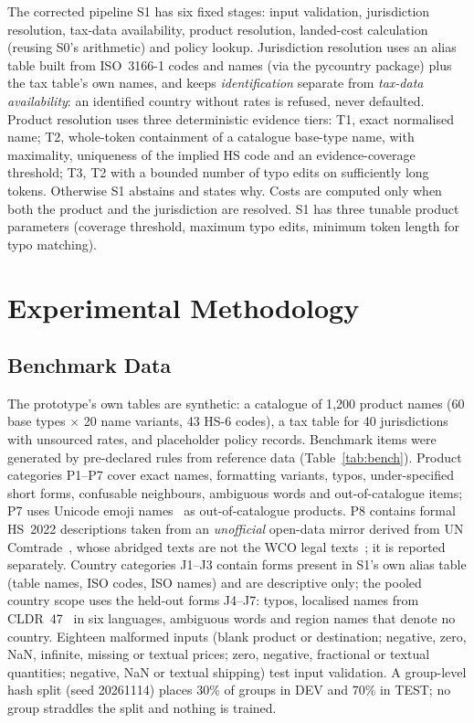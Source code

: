 \documentclass[conference]{IEEEtran}
\begin{document}
The corrected pipeline S1 has six fixed stages: input validation, jurisdiction resolution, tax-data availability,
product resolution, landed-cost calculation (reusing S0's arithmetic) and policy lookup. Jurisdiction resolution uses an
alias table built from ISO~3166-1 codes and names (via the pycountry package) plus the tax table's own names, and keeps
\emph{identification} separate from \emph{tax-data availability}: an identified country without rates is refused, never
defaulted. Product resolution uses three deterministic evidence tiers: T1, exact normalised name; T2, whole-token
containment of a catalogue base-type name, with maximality, uniqueness of the implied HS code and an evidence-coverage
threshold; T3, T2 with a bounded number of typo edits on sufficiently long tokens. Otherwise S1 abstains and states why.
Costs are computed only when both the product and the jurisdiction are resolved. S1 has three tunable product
parameters (coverage threshold, maximum typo edits, minimum token length for typo matching).

\section{Experimental Methodology}
\subsection{Benchmark Data}
The prototype's own tables are synthetic: a catalogue of 1{,}200 product names (60 base types $\times$ 20
name variants, 43 HS-6 codes), a tax table for 40 jurisdictions with unsourced rates, and placeholder policy records.
Benchmark items were generated by pre-declared rules from reference data (Table~\ref{tab:bench}). Product categories
P1--P7 cover exact names, formatting variants, typos, under-specified short forms, confusable neighbours, ambiguous words
and out-of-catalogue items; P7 uses Unicode emoji names~\cite{unicodeemoji} as out-of-catalogue products. P8 contains
formal HS~2022 descriptions taken from an \emph{unofficial} open-data mirror derived from UN Comtrade~\cite{hsmirror},
whose abridged texts are not the WCO legal texts~\cite{wcohs2022}; it is reported separately. Country categories J1--J3
contain forms present in S1's own alias table (table names, ISO codes, ISO names) and are descriptive only; the pooled
country scope uses the held-out forms J4--J7: typos, localised names from CLDR~47~\cite{cldr} in six languages,
ambiguous words and region names that denote no country. Eighteen malformed inputs (blank product or destination; negative, zero, NaN, infinite, missing or textual
prices; zero, negative, fractional or textual quantities; negative, NaN or textual shipping) test input validation. A group-level hash split (seed 20261114) places 30\% of groups in DEV and 70\% in TEST; no group
straddles the split and nothing is trained.
\end{document}
